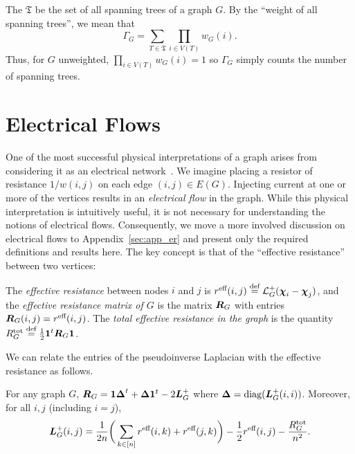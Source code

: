 \begin{remark}
	The  $\mathfrak{T}$ be the set of all spanning trees of a graph $G$. By the ``weight of all spanning trees'', we mean that
	\begin{equation}
	\label{eq:Gamma_G}
	\Gamma_G = \sum_{T\in \mathfrak{T}} \prod_{i\in  V(T)} w_G(i).
	\end{equation}
	Thus, for $G$ unweighted, $\prod_{i\in V(T)}w_G(i)=1$ so $\Gamma_G$ simply counts the number of spanning trees. 
\end{remark}






\section{Electrical Flows}
\label{sec:background_er}

One of  the most successful physical interpretations of a graph arises from considering it as an electrical network~\cite{ellens2011effective,tetali1991random}. 
We imagine placing a resistor of resistance $1/w(i,j)$ on each edge $(i,j)\in E(G)$. Injecting current at one or more of the vertices results in an \emph{electrical flow} in the graph. While this physical interpretation  is intuitively useful, it is  not necessary for understanding  the notions of electrical flows. Consequently, we move a more involved discussion on electrical flows to Appendix~\ref{sec:app_er} and present only the required definitions  and results here. The key concept is that of the ``effective resistance'' between  two vertices:  


\begin{definition}
	\label{def:effective_resistance}
	The \emph{effective resistance} between nodes $i$ and $j$ is $r^{\textnormal{eff}}(i,j) \overset{\text{def}}{=} \mathcal{L}_G^+(\boldsymbol{\chi}_i-\boldsymbol{\chi}_j)$, and the \emph{effective resistance matrix of $G$} is the matrix $\vb*{R}_G$ with entries $\vb*{R}_G(i,j)=r^{\textnormal{eff}}(i,j)$. The \emph{total effective resistance in the graph } is the quantity $R^{\textnormal{tot}}_G\overset{\text{def}}{=} \frac{1}{2}\vb{1}^t\vb*{R}_G\vb{1}$. 
\end{definition}

We can relate the entries of the pseudoinverse Laplacian with the effective resistance as follows.
\begin{lemma}
	\label{lem:er_props}
	For any graph $G$, $\vb*{R}_G = \vb{1} \vb*{\Delta} ^t + \vb*{\Delta}\vb{1}^t - 2\vb*{L}_G^+$ where $\vb*{\Delta}=\text{diag}(\vb*{L}_G^+(i,i))$. Moreover, for all $i,j$ (including $i=j$), 
	\begin{equation}
	\label{eq:L^+(i,j)}
	\vb*{L}_G^+(i,j) = \frac{1}{2n}\bigg(\sum_{k\in[n]}r^{\textnormal{eff}}(i,k)+r^{\textnormal{eff}}(j,k)\bigg) - \frac{1}{2}r^{\textnormal{eff}}(i,j) -\frac{R^{\textnormal{tot}}_G}{n^2}.
	\end{equation}
\end{lemma}

